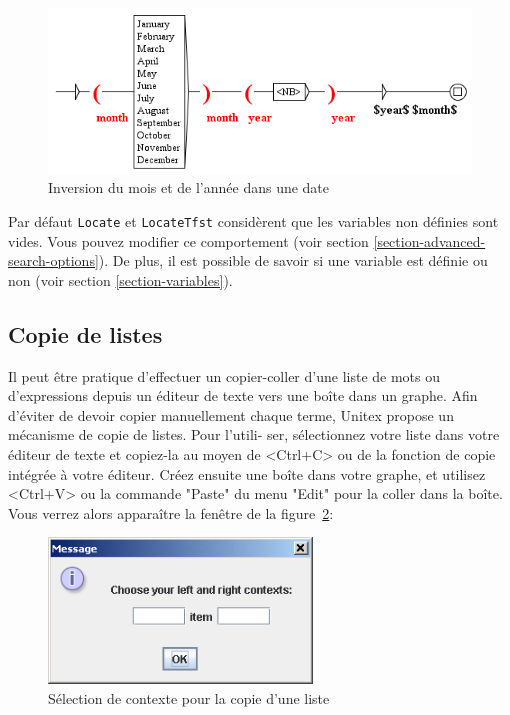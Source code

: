 \bigskip
\begin{figure}[h]
\begin{center}
\includegraphics[width=14.5cm]{resources/img/fig5-17.png}
\caption{Inversion du mois et de l’année dans une date\label{fig-date-grammar}}
\end{center}
\end{figure}


\bigskip
\noindent Par défaut \verb+Locate+ et \verb+LocateTfst+ considèrent que les variables non définies
sont vides. Vous pouvez modifier ce comportement (voir section \ref{section-advanced-search-options}).
De plus, il est  possible de savoir si une variable est définie ou non (voir section
\ref{section-variables}).

\subsection{Copie de listes}

Il peut être pratique d’effectuer un copier-coller d’une liste de mots ou d’expressions
depuis un éditeur de texte vers une boîte dans un graphe. Afin d’éviter de devoir copier
manuellement chaque terme, Unitex propose un mécanisme de copie de listes. Pour l’utili-
ser, sélectionnez votre liste dans votre éditeur de texte et copiez-la au moyen de <Ctrl+C> ou
de la fonction de copie intégrée à votre éditeur. Créez ensuite une boîte dans votre graphe,
et utilisez <Ctrl+V> ou la commande "Paste" du menu "Edit" pour la coller dans la boîte.
Vous verrez alors apparaître la fenêtre de la figure~\ref{fig-setting-contexts-for-multiple-copy}:

\bigskip
\begin{figure}[h]
\begin{center}
\includegraphics[width=7cm]{resources/img/fig5-18.png}
\caption{Sélection de contexte pour la copie d’une
liste\label{fig-setting-contexts-for-multiple-copy}}
\end{center}
\end{figure}

